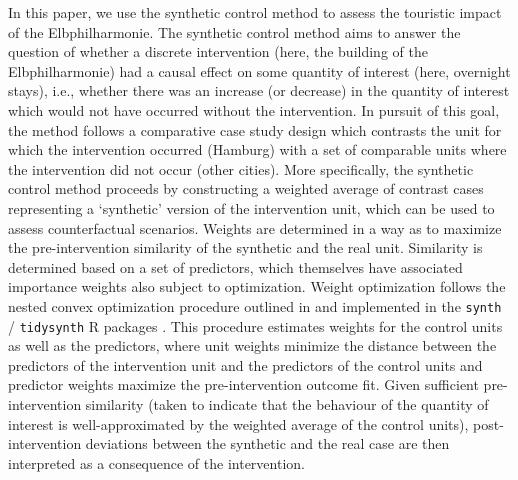 \documentclass[a4paper, 12pt]{article}
\begin{document}
In this paper, we use the synthetic control method \citep{abadie2021} to assess the touristic impact of the Elbphilharmonie. The synthetic control method aims to answer the question of whether a discrete intervention (here, the building of the Elbphilharmonie) had a causal effect on some quantity of interest (here, overnight stays), i.e., whether there was an increase (or decrease) in the quantity of interest which would not have occurred without the intervention. In pursuit of this goal, the method follows a comparative case study design which contrasts the unit for which the intervention occurred (Hamburg) with a set of comparable units where the intervention did not occur (other cities). More specifically, the synthetic control method proceeds by constructing a weighted average of contrast cases representing a `synthetic' version of the intervention unit, which can be used to assess counterfactual scenarios. Weights are determined in a way as to maximize the pre-intervention similarity of the synthetic and the real unit. Similarity is determined based on a set of predictors, which themselves have associated importance weights also subject to optimization. Weight optimization follows the nested convex optimization procedure outlined in \citet{abadie2010} and implemented in the \texttt{synth} / \texttt{tidysynth} R packages \citep{dunford2025}. This procedure estimates weights for the control units as well as the predictors, where unit weights minimize the distance between the predictors of the intervention unit and the predictors of the control units and predictor weights maximize the pre-intervention outcome fit. Given sufficient pre-intervention similarity (taken to indicate that the behaviour of the quantity of interest is well-approximated by the weighted average of the control units), post-intervention deviations between the synthetic and the real case are then interpreted as a consequence of the intervention.
\end{document}
